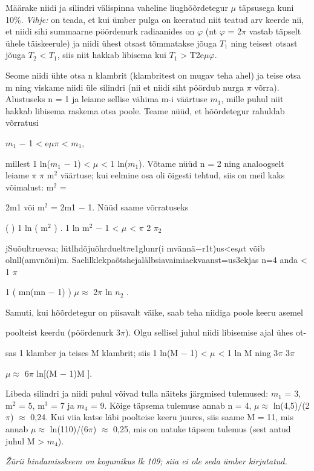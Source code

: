 
Määrake niidi ja silindri välispinna vaheline liughõõrdetegur $\mu$ täpsusega kuni 10\%.
\textit{Vihje:} on teada, et kui ümber pulga on keeratud niit teatud arv keerde nii, et niidi sihi summaarne pöördenurk radiaanides on $\varphi$ (nt $\varphi$ = 2$\pi$ vastab täpselt ühele täiskeerule) ja niidi ühest otsast tõmmatakse jõuga $T_1$ ning teisest otsast jõuga $T_2$ < $T_1$, siis niit hakkab libisema kui $T_1$ > T2e$\mu\varphi$.

\hint

\solu
Seome niidi ühte otsa n klambrit (klambritest on mugav teha ahel) ja teise otsa m ning viskame niidi üle silindri (nii et niidi siht pöördub nurga $\pi$ võrra). Alustuseks n = 1 ja leiame sellise vähima m-i väärtuse $m_1$, mille puhul niit hakkab libisema raskema otsa poole. Teame nüüd, et hõõrdetegur rahuldab võrratusi

$m_1$ $-$ 1 < e$\mu\pi$ < $m_1$,

millest 1 ln($m_1$ $-$ 1) < $\mu$ < 1 ln($m_1$). Võtame nüüd n = 2 ning analoogselt leiame $\pi$ $\pi$ m$^2$ väärtuse; kui eelmine osa oli õigesti tehtud, siis on meil kaks võimalust: m$^2$ =

2m1 või m$^2$ = 2m1 $-$ 1. Nüüd saame võrratuseks

( ) 1 ln ( m$^2$ ) . 1 ln m$^2$ $-$ 1 < $\mu$ < $\pi$ 2 $\pi_2$

jSuõultruevsa; lütlhdõjuõhrduelt$\pi$e1glunr(i mvännä$-$r1t)us<es$\mu$t võib olnll(amvnõni)m. Saelilklekpaõtshejalälbsiavaimiaekvaanst=us3ekjas n=4 anda < 1 $\pi$

1 ( mn(mn $-$ 1) ) $\mu \approx$ 2$\pi$ ln $n_2$ .

Samuti, kui hõõrdetegur on piisavalt väike, saab teha niidiga poole keeru asemel

poolteist keerdu (pöördenurk 3$\pi$). Olgu sellisel juhul niidi libisemise ajal ühes ot-

sas 1 klamber ja teises M klambrit; siis 1 ln(M $-$ 1) < $\mu$ < 1 ln M ning 3$\pi$ 3$\pi$

$\mu \approx$ 6$\pi$ ln[(M $-$ 1)M ].

Libeda silindri ja niidi puhul võivad tulla näiteks järgmised tulemused: $m_1$ = 3, m$^2$ = 5, m$^3$ = 7 ja $m_4$ = 9. Kõige täpsema tulemuse annab n = 4, $\mu \approx$ ln(4,5)/(2$\pi$) $\approx$ 0,24. Kui viia katse läbi poolteise keeru juures, siis saame M = 11, mis annab $\mu \approx$ ln(110)/(6$\pi$) $\approx$ 0,25, mis on natuke täpsem tulemus (sest antud juhul M > $m_4$).

\textit{Žürii hindamisskeem on kogumikus lk 109; siia ei ole seda ümber kirjutatud.}
\probend
